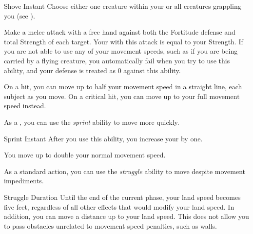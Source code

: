         \begin{instantability}{Shove}\label{Shove}
            Instant
            \rankline
            Choose either one creature within your  or all creatures grappling you (see ).

            Make a melee attack with a free hand against both the Fortitude defense and total Strength of each target.
            Your  with this attack is equal to your Strength.
            If you are not able to use any of your movement speeds, such as if you are being carried by a flying creature, you automatically fail when you try to use this ability, and your defense is treated as 0 against this ability.

            On a hit, you can move up to half your movement speed in a straight line,  each subject as you move.
            On a critical hit, you can move up to your full movement speed instead.
        \end{instantability}

         As a , you can use the \textit{sprint} ability to move more quickly.

        \begin{instantability}{Sprint}
            \label{Sprint}
            Instant
            \rankline
            After you use this ability, you increase your  by one.

            You move up to double your normal movement speed.
        \end{instantability}

         As a standard action, you can use the \textit{struggle} ability to move despite movement impediments.

        \begin{durationability}{Struggle}
            \label{Struggle}
            Duration
            \rankline
            Until the end of the current phase, your land speed becomes five feet, regardless of all other effects that would modify your land speed.
            In addition, you can move a distance up to your land speed.
            This does not allow you to pass obstacles unrelated to movement speed penalties, such as walls.
        \end{durationability}

